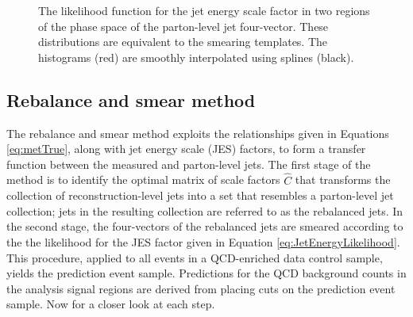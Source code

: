 \begin{figure}[h]
\centering
{}
\caption{The likelihood function for the jet energy scale factor in two regions of the phase space of the parton-level jet four-vector. These distributions are equivalent to the smearing templates. The histograms (red) are smoothly interpolated using splines (black).}
\label{fig:SmearEx}
\end{figure}


\subsection{Rebalance and smear method}
The rebalance and smear method exploits the relationships given in Equations \ref{eq:metTrue}, along with jet energy scale (JES) factors, to form a transfer function between the measured and parton-level jets. The first stage of the method is to identify the optimal matrix of scale factors $\hat{C}$ that transforms the collection of reconstruction-level jets into a set that resembles a parton-level jet collection; jets in the resulting collection are referred to as the rebalanced jets. In the second stage, the four-vectors of the rebalanced jets are smeared according to the the likelihood for the JES factor given in Equation \ref{eq:JetEnergyLikelihood}. This procedure, applied to all events in a QCD-enriched data control sample, yields the prediction event sample. Predictions for the QCD background counts in the analysis signal regions are derived from placing cuts on the prediction event sample. Now for a closer look at each step.

